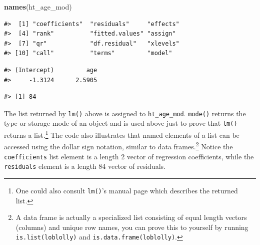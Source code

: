 \documentclass[
  11pt,
]{krantz}
\newenvironment{Shaded}{\begin{snugshade}}{\end{snugshade}}
\newcommand{\KeywordTok}[1]{\textcolor[rgb]{0.13,0.29,0.53}{\textbf{#1}}}
\newcommand{\NormalTok}[1]{#1}
\newcommand{\OperatorTok}[1]{\textcolor[rgb]{0.81,0.36,0.00}{\textbf{#1}}}
\theoremstyle{definition}
\theoremstyle{definition}
\theoremstyle{definition}
\theoremstyle{definition}
\theoremstyle{remark}
\begin{document}
\begin{Shaded}
\begin{Highlighting}[]
\KeywordTok{names}\NormalTok{(ht\_age\_mod)}
\end{Highlighting}
\end{Shaded}

\begin{verbatim}
#>  [1] "coefficients"  "residuals"     "effects"      
#>  [4] "rank"          "fitted.values" "assign"       
#>  [7] "qr"            "df.residual"   "xlevels"      
#> [10] "call"          "terms"         "model"
\end{verbatim}

\begin{Shaded}
\end{Shaded}

\begin{verbatim}
#> (Intercept)         age 
#>     -1.3124      2.5905
\end{verbatim}

\begin{Shaded}
\end{Shaded}

\begin{verbatim}
#> [1] 84
\end{verbatim}

The list returned by \texttt{lm()} above is assigned to \texttt{ht\_age\_mod}. \texttt{mode()} returns the type or storage mode of an object and is used above just to prove that \texttt{lm()} returns a list.\footnote{One could also consult \texttt{lm()}'s manual page which describes the returned list.} The code also illustrates that named elements of a list can be accessed using the dollar sign notation, similar to data frames.\footnote{A data frame is actually a specialized list consisting of equal length vectors (columns) and unique row names, you can prove this to yourself by running \texttt{is.list(loblolly)} and \texttt{is.data.frame(loblolly)}.} Notice the \texttt{coefficients} list element is a length 2 vector of regression coefficients, while the \texttt{residuals} element is a length 84 vector of residuals.
\end{document}
